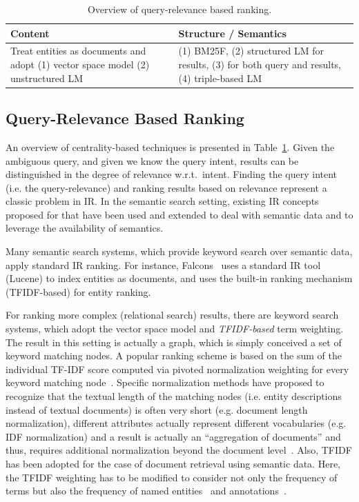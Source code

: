 \begin{table}[htbp]
  \centering
  \caption{Overview of query-relevance based ranking.}
    \begin{tabular}{|p{3.2cm}|p{3.8cm}|}
    \hline
    \textbf{Content} & \textbf{Structure} / \textbf{Semantics}  \bigstrut\\
    \hline
    \hline
    Treat entities as documents and adopt (1) vector space model (2) unstructured LM & (1) BM25F, (2) structured LM for results, (3) for both query and results, (4) triple-based LM \bigstrut\\
    \hline
    \end{tabular}%
  \label{tab:queryrelevance}%
\end{table}%


\subsection{Query-Relevance Based Ranking} An overview of centrality-based techniques is presented in Table~\ref{tab:queryrelevance}. Given the ambiguous query, and given we know the query intent, results can be distinguished in the degree of relevance w.r.t.~intent. Finding the query intent (i.e. the query-relevance) and ranking results based on relevance represent a classic problem in IR. In the semantic search setting, existing IR concepts proposed for that have been used and extended to deal with semantic data and to leverage the availability of semantics. 

Many semantic search systems, which provide keyword search over semantic data, apply standard IR ranking. For instance, Falcons~\cite{DBLP:journals/ijswis/ChengQ09} uses a standard IR tool (Lucene) to index entities as documents, and uses the built-in ranking mechanism (TFIDF-based) for entity ranking.  

For ranking more complex (relational search) results, there are keyword search systems, which adopt the vector space model and \emph{TFIDF-based} term weighting. The result in this setting is actually a graph, which is simply conceived a set of keyword matching nodes. A popular ranking scheme is based on the sum of the individual TF-IDF score computed via pivoted normalization weighting for every keyword matching node~\cite{DBLP:conf/icde/TranWRC09}. Specific normalization methods have proposed to recognize that the textual length of the matching nodes (i.e. entity descriptions instead of textual documents) is often very short (e.g. document length normalization), different attributes actually represent different vocabularies (e.g. IDF normalization) and a result is actually an ``aggregation of documents'' and thus, requires additional normalization beyond the document level~\cite{DBLP:conf/sigmod/LiuYMC06}. Also, TFIDF has been adopted for the case of document retrieval using semantic data. Here, the TFIDF weighting has to be modified to consider not only the frequency of terms but also the frequency of named entities~\cite{DBLP:series/sci/NgoC10} and annotations~\cite{DBLP:journals/tkde/CastellsFV07}.  


